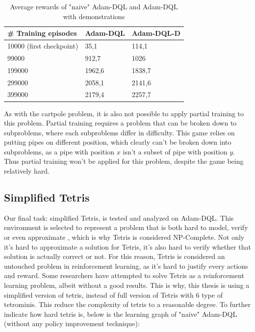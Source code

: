       \begin{table}[H]
    \centering
        \label{flappycomparison2}
    \begin{tabular}{|l|l|l|}
    \hline
    \# Training episodes     &  Adam-DQL       & Adam-DQL-D \\ \hline
    10000 (first checkpoint) & 35,1            & 114,1     \\ \hline
    99000                    & 912,7           & 1026    \\ \hline
    199000                   & 1962,6          & 1838,7   \\ \hline
    299000                   & 2058,1          & 2141,6   \\ \hline
    399000                   & 2179,4          & 2257,7   \\ \hline
    \end{tabular}
    \caption[Average rewards of "naive" Adam-DQL and Adam-DQL with demonstrations] {Average rewards of "naive" Adam-DQL and Adam-DQL with demonstrations \cite{flappyDL} }
    \end{table}
    
    As with the cartpole problem, it is also not possible to apply partial training to this problem. Partial training requires a problem that can be broken down to subproblems, where each subproblems differ in difficulty. This game relies on putting pipes on different position, which clearly can't be broken down into subproblems, as a pipe with position $x$ isn't a subset of pipe with position $y$. Thus partial training won't be applied for this problem, despite the game being relatively hard.
    
    \subsection{Simplified Tetris}
    Our final task: simplified Tetris, is tested and analyzed on Adam-DQL. This environment is selected to represent a problem that is both hard to model, verify or even approximate \cite{DBLP:journals/corr/cs-CC-0210020}, which is why Tetris is considered NP-Complete. Not only it's hard to approximate a solution for Tetris, it's also hard to verify whether that solution is actually correct or not. For this reason, Tetris is considered an untouched problem in reinforcement learning, as it's hard to justify every actions and reward. Some researchers have attempted to solve Tetris as a reinforcement learning problem, albeit without a good results. This is why, this thesis is using a simplified version of tetris, instead of full version of Tetris with 6 type of tetrominis. This reduce the complexity of tetris to a reasonable degree. To further indicate how hard tetris is, below is the learning graph of "naive" Adam-DQL (without any policy improvement technique):
    
